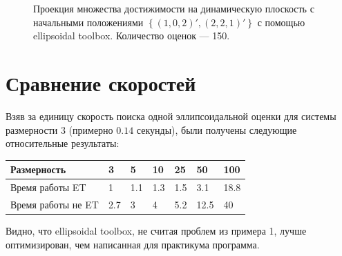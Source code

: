 \documentclass[10pt, a4paper]{article}
\begin{document}
\begin{figure}[H]
\caption{Проекция множества достижимости на динамическую плоскость с начальными положениями $\left\{(1,0,2)',(2,2,1)'\right\}$ с помощью ellipsoidal toolbox. Количество оценок --- 150.}
\end{figure}
\section{Сравнение скоростей}
Взяв за единицу скорость поиска одной эллипсоидальной оценки для системы размерности 3 (примерно $0.14$ секунды), были получены следующие относительные результаты:
\begin{tabular}{|l|l|l|l|l|l|l|}
\hline
Размерность & 3 & 5 & 10 & 25 & 50 & 100 \\
\hline
Время работы ET & 1 & 1.1 & 1.3 & 1.5 & 3.1 &  18.8 \\
\hline
Время работы не ET & 2.7 & 3 & 4 & 5.2 & 12.5 & 40 \\
\hline
\end{tabular}

Видно, что ellipsoidal toolbox, не считая проблем из примера 1, лучше оптимизирован, чем написанная для практикума программа.
\end{document}
